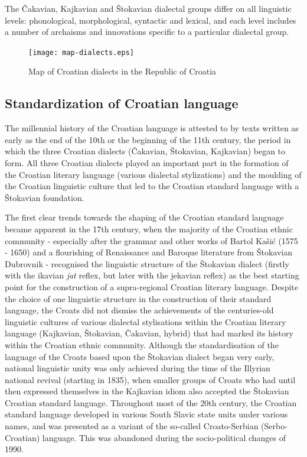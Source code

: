 \begin{multicols}{2}
The Čakavian, Kajkavian and Štokavian dialectal groups differ on all linguistic levels: phonological, morphological, syntactic and lexical, and each level includes a number of archaisms and innovations specific to a particular dialectal group.

\begin{figure}[htb]
  \center
  \texttt{[image: map-dialects.eps]}
  \caption{Map of Croatian dialects in the Republic of Croatia}
  \label{fig:dijalekti_en}
\end{figure}


\subsection{Standardization of Croatian language}

The millennial history of the Croatian language is attested to by texts written as early as the end of the 10th or the beginning of the 11th century, the period in which the three Croatian dialects (Čakavian, Štokavian, Kajkavian) began to form. All three Croatian dialects played an important part in the formation of the Croatian literary language (various dialectal stylizations) and the moulding of the Croatian linguistic culture that led to the Croatian standard language with a Štokavian foundation.


The first clear trends towards the shaping of the Croatian standard language became apparent in the 17th century, when the majority of the Croatian ethnic community - especially after the grammar and other works of Bartol Kašić (1575 - 1650) and a flourishing of Renaissance and Baroque literature from Štokavian Dubrovnik - recognised the linguistic structure of the Štokavian dialect (firstly with the ikavian \emph{jat} reflex, but later with the jekavian reflex) as the best starting point for the construction of a supra-regional Croatian literary language. Despite the choice of one linguistic structure in the construction of their standard language, the Croats did not dismiss the achievements of the centuries-old linguistic cultures of various dialectal stylisations within the Croatian literary language (Kajkavian, Štokavian, Čakavian, hybrid) that had marked its history within the Croatian ethnic community. Although the standardisation of the language of the Croats based upon the Štokavian dialect began very early, national linguistic unity was only achieved during the time of the Illyrian national revival (starting in 1835), when smaller groups of Croats who had until then expressed themselves in the Kajkavian idiom also accepted the Štokavian Croatian standard language. Throughout most of the 20th century, the Croatian standard language developed in various South Slavic state units under various names, and was presented as a variant of the so-called Croato-Serbian (Serbo-Croatian) language. This was abandoned during the socio-political changes of 1990.


\end{multicols}
